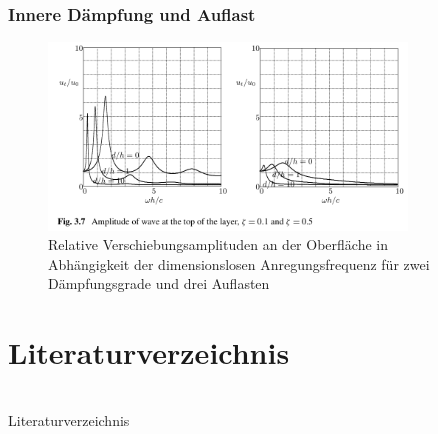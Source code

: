 \documentclass[hyperref={pdfpagemode=FullScreen, colorlinks=false}]{beamer}
\begin{document}
\begin{frame}
\frametitle{Innere Dämpfung und Auflast}

\begin{figure}
\includegraphics[width=0.85\textwidth]{fig_img/earthquake_damped_top_load.png}
\caption*{Relative Verschiebungsamplituden an der Oberfläche in Abhängigkeit der dimensionslosen Anregungsfrequenz für zwei Dämpfungsgrade und drei Auflasten \cite{Verruijt2010}}
\end{figure}

\end{frame}


\section{Literaturverzeichnis}

\section{} %
\begin{frame}[allowframebreaks]{Literaturverzeichnis}
	\printbibliography
\end{frame}
\end{document}
